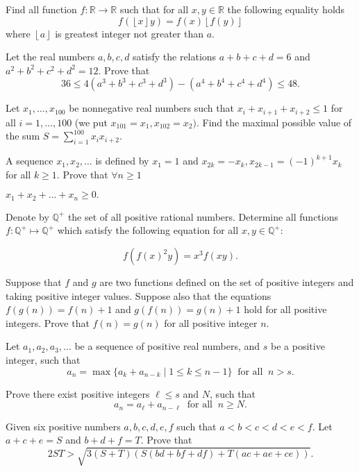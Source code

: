 \item[\textbf{A1.}]
Find all function 
$f:\mathbb{R}\rightarrow\mathbb{R}$
 such that for all 
$x,y\in\mathbb{R}$
 the following equality holds 
\[
f(\left\lfloor x\right\rfloor y)=f(x)\left\lfloor f(y)\right\rfloor \]
 where 
$\left\lfloor a\right\rfloor $
 is greatest integer not greater than 
$a.$

\item[\textbf{A2.}]
Let the real numbers 
$a,b,c,d$
 satisfy the relations 
$a+b+c+d=6$
 and 
$a^2+b^2+c^2+d^2=12.$
 Prove that
\[36 \leq 4 \left(a^3+b^3+c^3+d^3\right) - \left(a^4+b^4+c^4+d^4 \right) \leq 48.\]

\item[\textbf{A3.}]
Let 
$x_1, \ldots , x_{100}$
 be nonnegative real numbers such that 
$x_i + x_{i+1} + x_{i+2} \leq 1$
 for all 
$i = 1, \ldots , 100$
 (we put 
$x_{101 } = x_1, x_{102} = x_2).$
 Find the maximal possible value of the sum 
$S = \sum^{100}_{i=1} x_i x_{i+2}.$

\item[\textbf{A4.}]
A sequence 
$x_1, x_2, \ldots$
 is defined by 
$x_1 = 1$
 and 
$x_{2k}=-x_k, x_{2k-1} = (-1)^{k+1}x_k$
 for all 
$k \geq 1.$
 Prove that 
$\forall n \geq 1$
 
$x_1 + x_2 + \ldots + x_n \geq 0.$

\item[\textbf{A5.}]
Denote by 
$\mathbb{Q}^+$
 the set of all positive rational numbers. Determine all functions 
$f : \mathbb{Q}^+ \mapsto \mathbb{Q}^+$
 which satisfy the following equation for all 
$x, y \in \mathbb{Q}^+:$
 
\[f\left( f(x)^2y \right) = x^3 f(xy).\]

\item[\textbf{A6.}]
Suppose that 
$f$
 and 
$g$
 are two functions defined on the set of positive integers and taking positive integer values. Suppose also that the equations 
$f(g(n)) = f(n) + 1$
 and 
$g(f(n)) = g(n) + 1$
 hold for all positive integers. Prove that 
$f(n) = g(n)$
 for all positive integer 
$n.$

\item[\textbf{A7.}]
Let 
$a_1, a_2, a_3, \ldots$
 be a sequence of positive real numbers, and 
$s$
 be a positive integer, such that
\[a_n = \max \{ a_k + a_{n-k} \mid 1 \leq k \leq n-1 \} \ \textrm{ for all } \ n > s.\]


Prove there exist positive integers 
$\ell \leq s$
 and 
$N$, 
 such that
\[a_n = a_{\ell} + a_{n - \ell} \ \textrm{ for all } \ n \geq N.\]

\item[\textbf{A8.}]
Given six positive numbers 
$a,b,c,d,e,f$
 such that 
$a < b < c < d < e < f.$
 Let 
$a+c+e=S$
 and 
$b+d+f=T.$
 Prove that
\[2ST > \sqrt{3(S+T)\left(S(bd + bf + df) + T(ac + ae + ce) \right)}.\]

